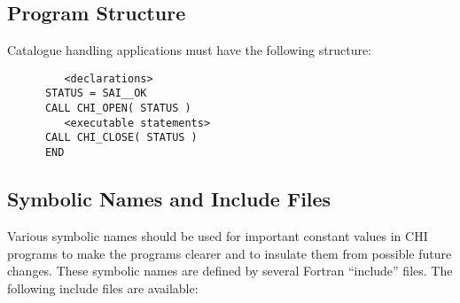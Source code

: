 \subsection{Program Structure}

Catalogue handling applications must have the following structure:

\begin{verbatim}
         <declarations>
      STATUS = SAI__OK
      CALL CHI_OPEN( STATUS )
         <executable statements>
      CALL CHI_CLOSE( STATUS )
      END
\end{verbatim}

\subsection{Symbolic Names and Include Files}

Various symbolic names should be used for important constant values in CHI
programs to make the programs clearer and to insulate them from possible future
changes. These symbolic names are defined by several Fortran ``include'' files.
The following include files are available:

